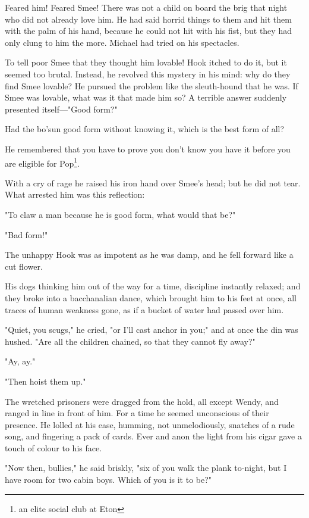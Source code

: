Feared him!
Feared Smee!
There was not a child on board the brig that night who did not already love him.
He had said horrid things to them and hit them with the palm of his hand, because he could not hit with his fist, but they had only clung to him the more.
Michael had tried on his spectacles.

To tell poor Smee that they thought him lovable!
Hook itched to do it, but it seemed too brutal.
Instead, he revolved this mystery in his mind:
why do they find Smee lovable?
He pursued the problem like the sleuth-hound that he was.
If Smee was lovable, what was it that made him so?
A terrible answer suddenly presented itself—"Good form?"

Had the bo'sun good form without knowing it, which is the best form of all?

He remembered that you have to prove you don't know you have it before you are eligible for Pop\footnote{an elite social club at Eton}.

With a cry of rage he raised his iron hand over Smee's head;
but he did not tear.
What arrested him was this reflection:

"To claw a man because he is good form, what would that be?"

"Bad form!"

The unhappy Hook was as impotent as he was damp, and he fell forward like a cut flower.

His dogs thinking him out of the way for a time, discipline instantly relaxed;
and they broke into a bacchanalian dance, which brought him to his feet at once, all traces of human weakness gone, as if a bucket of water had passed over him.

"Quiet, you scugs," he cried, "or I'll cast anchor in you;" and at once the din was hushed.
"Are all the children chained, so that they cannot fly away?"

"Ay, ay."

"Then hoist them up."

The wretched prisoners were dragged from the hold, all except Wendy, and ranged in line in front of him.
For a time he seemed unconscious of their presence.
He lolled at his ease, humming, not unmelodiously, snatches of a rude song, and fingering a pack of cards.
Ever and anon the light from his cigar gave a touch of colour to his face.

"Now then, bullies," he said briskly, "six of you walk the plank to-night, but I have room for two cabin boys.
Which of you is it to be?"

